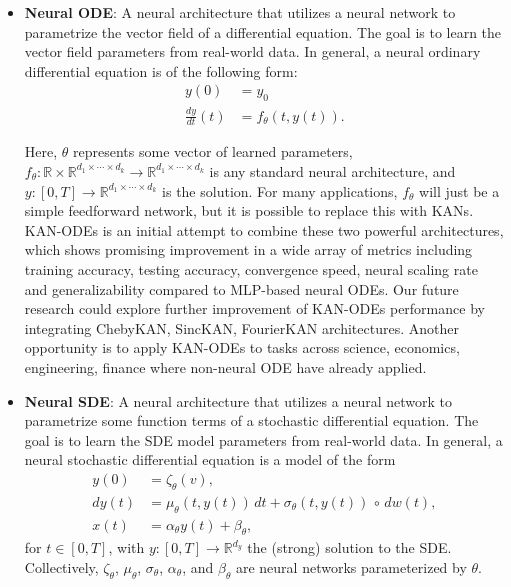 \begin{itemize}
    \item \textbf{Neural ODE}: A neural architecture that utilizes a neural network to parametrize the vector field of a differential equation. The goal is to learn the vector field parameters from real-world data. In general, a neural ordinary differential equation \cite{chen2018neural} is of the following form:
    \begin{align}
        y(0) &= y_0 \\
        \frac{dy}{dt}(t) &= f_\theta(t, y(t)).
    \end{align}
    
    Here, \(\theta\) represents some vector of learned parameters, \(f_\theta : \mathbb{R} \times \mathbb{R}^{d_1 \times \cdots \times d_k} \to \mathbb{R}^{d_1 \times \cdots \times d_k}\) is any standard neural architecture, and \(y : [0, T] \to \mathbb{R}^{d_1 \times \cdots \times d_k}\) is the solution. For many applications, \(f_\theta\) will just be a simple feedforward network, but it is possible to replace this with KANs. KAN-ODEs \cite{koenig2024kan} is an initial attempt to combine these two powerful architectures, which shows promising improvement in a wide array of metrics including training accuracy, testing accuracy, convergence speed, neural scaling rate and generalizability compared to MLP-based neural ODEs. Our future research could explore further improvement of KAN-ODEs performance by integrating ChebyKAN, SincKAN, FourierKAN architectures. Another opportunity is to apply KAN-ODEs to tasks across science, economics, engineering, finance where non-neural ODE have already applied.

    \item \textbf{Neural SDE}: A neural architecture that utilizes a neural network to parametrize some function terms of a stochastic differential equation. The goal is to learn the SDE model parameters from real-world data. In general, a neural stochastic differential equation is a model of the form
    \begin{align}
        y(0) &= \zeta_\theta(v), \\
        dy(t) &= \mu_\theta(t, y(t)) \, dt + \sigma_\theta(t, y(t)) \, \circ \, dw(t), \\
        x(t) &= \alpha_\theta y(t) + \beta_\theta,
    \end{align}
    for \( t \in [0, T] \), with \( y : [0, T] \to \mathbb{R}^{d_y} \) the (strong) solution to the SDE. Collectively, \(\zeta_\theta\), \(\mu_\theta\), \(\sigma_\theta\), \(\alpha_\theta\), and \(\beta_\theta\) are neural networks parameterized by \(\theta\).


\end{itemize}
